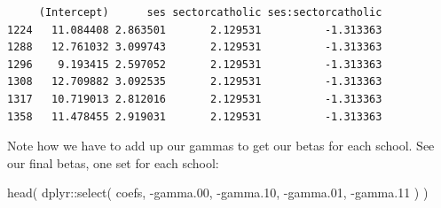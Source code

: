 \documentclass[
  letterpaper,
  DIV=11,
  numbers=noendperiod]{scrreprt}
\newenvironment{Shaded}{}{}
\newcommand{\AttributeTok}[1]{\textcolor[rgb]{0.49,0.56,0.16}{#1}}
\newcommand{\FloatTok}[1]{\textcolor[rgb]{0.25,0.63,0.44}{#1}}
\newcommand{\FunctionTok}[1]{\textcolor[rgb]{0.02,0.16,0.49}{#1}}
\newcommand{\NormalTok}[1]{#1}
\newcommand{\OtherTok}[1]{\textcolor[rgb]{0.00,0.44,0.13}{#1}}
\newcommand{\SpecialCharTok}[1]{\textcolor[rgb]{0.25,0.44,0.63}{#1}}
\newcommand{\StringTok}[1]{\textcolor[rgb]{0.25,0.44,0.63}{#1}}
\begin{document}
\begin{verbatim}
     (Intercept)      ses sectorcatholic ses:sectorcatholic
1224   11.084408 2.863501       2.129531          -1.313363
1288   12.761032 3.099743       2.129531          -1.313363
1296    9.193415 2.597052       2.129531          -1.313363
1308   12.709882 3.092535       2.129531          -1.313363
1317   10.719013 2.812016       2.129531          -1.313363
1358   11.478455 2.919031       2.129531          -1.313363
\end{verbatim}

\begin{Shaded}
\end{Shaded}

Note how we have to add up our gammas to get our betas for each school.
See our final betas, one set for each school:

\begin{Shaded}
\begin{Highlighting}[]
\FunctionTok{head}\NormalTok{( dplyr}\SpecialCharTok{::}\FunctionTok{select}\NormalTok{( coefs, }\SpecialCharTok{{-}}\NormalTok{gamma}\FloatTok{.00}\NormalTok{, }\SpecialCharTok{{-}}\NormalTok{gamma}\FloatTok{.10}\NormalTok{, }\SpecialCharTok{{-}}\NormalTok{gamma}\FloatTok{.01}\NormalTok{, }\SpecialCharTok{{-}}\NormalTok{gamma}\FloatTok{.11}\NormalTok{ ) )}
\end{Highlighting}
\end{Shaded}
\end{document}
